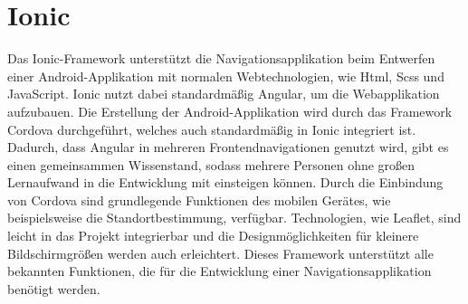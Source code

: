 \section{Ionic}

Das Ionic-Framework unterstützt die Navigationsapplikation beim Entwerfen einer Android-Applikation mit normalen Webtechnologien, wie Html, Scss und JavaScript. 
Ionic nutzt dabei standardmäßig Angular, um die Webapplikation aufzubauen.
Die Erstellung der Android-Applikation wird durch das Framework Cordova durchgeführt, welches auch standardmäßig in Ionic integriert ist. 
Dadurch, dass Angular in mehreren Frontendnavigationen genutzt wird, gibt es einen gemeinsammen Wissenstand, sodass mehrere Personen ohne großen Lernaufwand in die Entwicklung mit einsteigen können. 
Durch die Einbindung von Cordova sind grundlegende Funktionen des mobilen Gerätes, wie beispielsweise die Standortbestimmung, verfügbar. 
Technologien, wie Leaflet, sind leicht in das Projekt integrierbar und die Designmöglichkeiten für kleinere Bildschirmgrößen werden auch erleichtert.
Dieses Framework unterstützt alle bekannten Funktionen, die für die Entwicklung einer Navigationsapplikation benötigt werden\cite{IonicInfoSite}.
